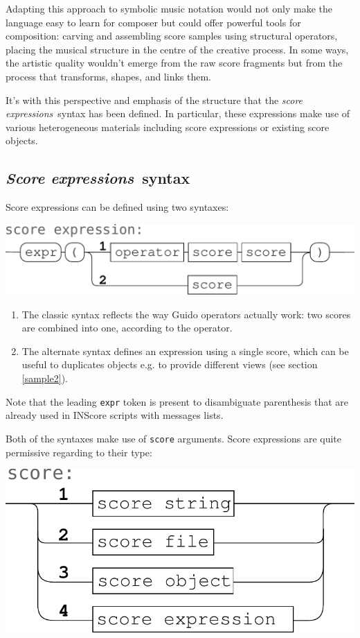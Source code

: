 \documentclass{article}
\newcommand{\OSC}[1]{{\fontsize{9.5pt}{10pt} \selectfont\texttt{#1}}}
\newcommand{\sExpr}{\emph{score expressions}}
\newcommand{\SExpr}{\emph{Score expressions}}
\begin{document}
Adapting this approach to symbolic music notation would not only make the language easy to learn for composer but could offer powerful tools for composition: carving and assembling score samples using structural operators, placing the musical structure in the centre of the creative process. In some ways, the artistic quality wouldn't emerge from the raw score fragments but from the process that transforms, shapes, and links them. 

It's with this perspective 
and emphasis of the structure that the \sExpr\ syntax has been defined. In particular, these expressions  make use of various heterogeneous materials including score expressions or existing score objects.

\subsection{\SExpr\ syntax}
\smallbreak
Score expressions can be defined using two syntaxes:
\begin{center}
\includegraphics[width=0.9\columnwidth]{imgs/syntax1}
\end{center}

\begin{enumerate}
\item The classic syntax reflects the way Guido operators actually work: two scores are combined into one, according to the operator.
\item The alternate syntax defines an expression using a single score, which can be useful to duplicates objects e.g. to provide different views (see section \ref{sample2}).
\end{enumerate}

Note that the leading \OSC{expr} token is present to disambiguate parenthesis that are already used in INScore scripts with messages lists.

Both of the syntaxes make use of \OSC{score} arguments. Score expressions are quite permissive regarding to their type:
\begin{center}
\includegraphics[width=0.7\columnwidth]{imgs/syntax2}
\end{center}
\end{document}
